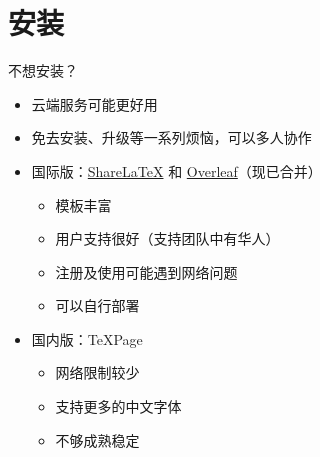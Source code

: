 \section{安装}

\begin{frame}{不想安装？}
\begin{itemize}
  \item 云端服务可能更好用
  \item 免去安装、升级等一系列烦恼，可以多人协作
  \item 国际版：\href{https://www.sharelatex.com}{\textcolor{酡红}{ShareLaTeX}} 和
        \href{https://www.overleaf.com}{\textcolor{松花绿}{Overleaf}}（现已合并）

    \begin{itemize}
      \item 模板丰富
      \item 用户支持很好（支持团队中有华人）
      \item 注册及使用可能遇到网络问题
      \item 可以自行部署
    \end{itemize}

  \item 国内版：TeXPage 

    \begin{itemize}
      \item 网络限制较少
      \item 支持更多的中文字体
      \item 不够成熟稳定
    \end{itemize}
\end{itemize}
\end{frame}

